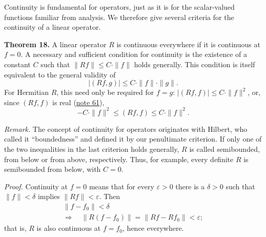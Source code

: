 \documentclass[fontsize=13pt,twoside,openany,headings=normal,parskip=false,bookmarkpackage=false,DIV=calc]{scrbook}
\begin{document}
Continuity is fundamental for operators, just as it is for the scalar-valued functions familiar from analysis. We therefore give several criteria for the continuity of a linear operator.

\leavevmode{}\textbf{Theorem 18.}\label{thm:II.18} A linear operator $R$ is continuous everywhere if it is continuous at $f=0$. A necessary and sufficient condition for continuity is the existence of a constant $C$ such that $\|Rf\|\leq C\cdot\|f\|$ holds generally. This condition is itself equivalent to the general validity of
\[
|(Rf,g)|\leq C\cdot\|f\|\cdot\|g\|.
\]
For Hermitian $R$, this need only be required for $f=g$: $|(Rf,f)|\leq C\cdot\|f\|^2$, or, since $(Rf,f)$ is real (\hyperlink{note-61}{note 61}),
\[
-C\cdot\|f\|^2\leq(Rf,f)\leq C\cdot\|f\|^2.
\]

\hypertarget{origpage-52}{}%
\emph{Remark.} The concept of continuity for operators originates with Hilbert, who called it ``boundedness'' and defined it by our penultimate criterion. If only one of the two inequalities in the last criterion holds generally, $R$ is called semibounded, from below or from above, respectively. Thus, for example, every definite $R$ is semibounded from below, with $C=0$.

\emph{Proof.} Continuity at $f=0$ means that for every $\varepsilon>0$ there is a $\delta>0$ such that $\|f\|<\delta$ implies $\|Rf\|<\varepsilon$. Then
\begin{gather*}
\|f-f_0\|<\delta\\
\Longrightarrow\quad\|R(f-f_0)\|=\|Rf-Rf_0\|<\varepsilon;
\end{gather*}
that is, $R$ is also continuous at $f=f_0$, hence everywhere.
\end{document}
